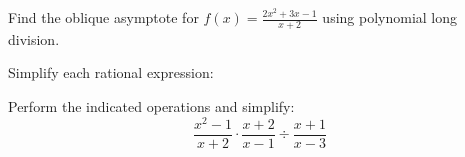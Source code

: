 \documentclass[12pt]{exam}
\begin{document}
\begin{questions}
\question[10]
Find the oblique asymptote for $f(x) = \frac{2x^2+3x-1}{x+2}$ using polynomial long division.
\vspace*{5cm}

\newpage

\question[8]
Simplify each rational expression:

\question[7]
Perform the indicated operations and simplify:
$$\frac{x^2-1}{x+2} \cdot \frac{x+2}{x-1} \div \frac{x+1}{x-3}$$
\vspace*{4cm}

\end{questions}
\end{document}
